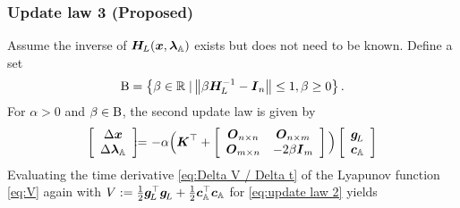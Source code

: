 \documentclass[journal]{IEEEtranTIE}
\begin{document}
\subsubsection{Update law 3 (Proposed)}
Assume the inverse of $\boldsymbol{H}_{\! L}(\boldsymbol{x},\boldsymbol{\lambda}_{\mathbb{A}})$ exists but does not need to be known. Define a set 
\begin{align}\label{eq:beta set}
{\rm B} = \left\{\beta \in \R \; | \left \| \beta \mm{H}_{\! L}^{-1} - \mm{I}_n \right\| \le 1, \beta \ge 0 \right\}.
\end{align}
For $\alpha > 0$ and $\beta \in {\rm B}$, the second update law is given by 
%
\begin{eqnarray}\label{eq:update law 3}
\left[ {\begin{array}{*{20}{c}}
{\Delta \mv{x}}\\
{\Delta \mv{\lambda}_{\mathbb{A}}}
\end{array}} \right] 
& \!\!\!\! := \!\!\!\! &  - \alpha \Big(\mm{K}^\top + \left[ {\begin{array}{*{20}{c}}
\mm{O}_{n \times n}&\mm{O}_{n \times m}\\
\mm{O}_{m \times n}&{ - 2\beta {\mm{I}_m}}
\end{array}} \right] \Big) \left[ {\begin{array}{*{20}{c}}
{\mv{g}_{\!L}}\\
{\mv{c}_{\mathbb{A}}}
\end{array}} \right]\notag \\
\end{eqnarray}
%
Evaluating the time derivative \eqref{eq:Delta V / Delta t} of the Lyapunov function \eqref{eq:V} again with $V := \tfrac{1}{2}\boldsymbol{g}_{\!L}^\top \boldsymbol{g}_{\!L} + \tfrac{1}{2}\boldsymbol{c}_{\mathbb{A}}^\top\boldsymbol{c}_{\mathbb{A}}$ for \eqref{eq:update law 2} yields
%
\end{document}

